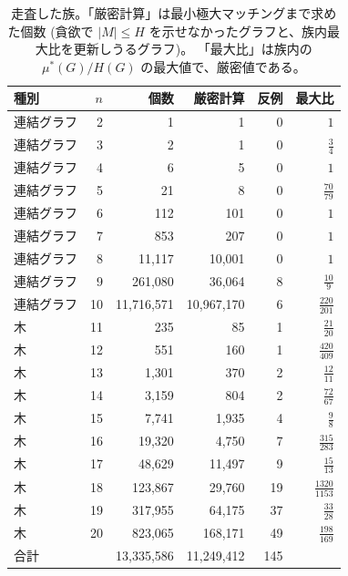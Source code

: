 \documentclass[paper=a4,fontsize=10.5pt,jafontsize=10.5pt]{jlreq}
\theoremstyle{plain}
\theoremstyle{definition}
\begin{document}
\begin{table}[htbp]
\centering
\caption{走査した族。「厳密計算」は最小極大マッチングまで求めた個数
(貪欲で $|M| \le H$ を示せなかったグラフと、族内最大比を更新しうるグラフ)。
「最大比」は族内の $\mu^*(G)/H(G)$ の最大値で、厳密値である。}
\label{tab:fams}
\begin{tabular}{lrrrrr}
\toprule
種別 & $n$ & 個数 & 厳密計算 & 反例 & 最大比 \\
\midrule
連結グラフ & 2 & 1 & 1 & 0 & $1$ \\
連結グラフ & 3 & 2 & 1 & 0 & $\frac{3}{4}$ \\
連結グラフ & 4 & 6 & 5 & 0 & $1$ \\
連結グラフ & 5 & 21 & 8 & 0 & $\frac{70}{79}$ \\
連結グラフ & 6 & 112 & 101 & 0 & $1$ \\
連結グラフ & 7 & 853 & 207 & 0 & $1$ \\
連結グラフ & 8 & 11,117 & 10,001 & 0 & $1$ \\
連結グラフ & 9 & 261,080 & 36,064 & 8 & $\frac{10}{9}$ \\
連結グラフ & 10 & 11,716,571 & 10,967,170 & 6 & $\frac{220}{201}$ \\
木 & 11 & 235 & 85 & 1 & $\frac{21}{20}$ \\
木 & 12 & 551 & 160 & 1 & $\frac{420}{409}$ \\
木 & 13 & 1,301 & 370 & 2 & $\frac{12}{11}$ \\
木 & 14 & 3,159 & 804 & 2 & $\frac{72}{67}$ \\
木 & 15 & 7,741 & 1,935 & 4 & $\frac{9}{8}$ \\
木 & 16 & 19,320 & 4,750 & 7 & $\frac{315}{283}$ \\
木 & 17 & 48,629 & 11,497 & 9 & $\frac{15}{13}$ \\
木 & 18 & 123,867 & 29,760 & 19 & $\frac{1320}{1153}$ \\
木 & 19 & 317,955 & 64,175 & 37 & $\frac{33}{28}$ \\
木 & 20 & 823,065 & 168,171 & 49 & $\frac{198}{169}$ \\
\midrule
\multicolumn{2}{l}{合計} & 13,335,586 & 11,249,412 & 145 & \\
\bottomrule
\end{tabular}
\end{table}
\end{document}
